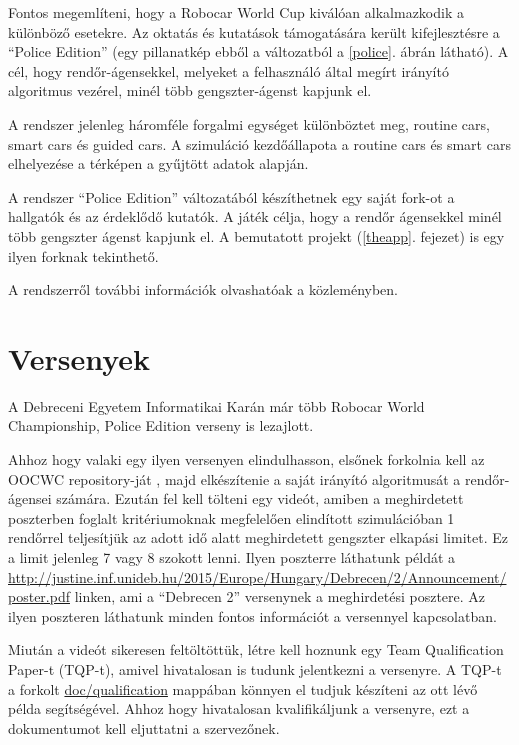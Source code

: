 \documentclass[a4paper,12pt]{report}
\begin{document}
\vspace{2mm}
Fontos megemlíteni, hogy a Robocar World Cup kiválóan alkalmazkodik a különböző esetekre. Az oktatás és kutatások támogatására került kifejlesztésre a ``Police Edition'' (egy pillanatkép ebből a változatból a \ref{police}. ábrán látható). A cél, hogy rendőr-ágensekkel, melyeket a felhasználó által megírt irányító algoritmus vezérel, minél több gengszter-ágenst kapjunk el.

\vspace{2mm}
A rendszer jelenleg háromféle forgalmi egységet különböztet meg, routine cars, smart cars és guided cars. A szimuláció kezdőállapota a routine cars és smart cars elhelyezése a térképen a gyűjtött adatok alapján.

\vspace{2mm}
A rendszer ``Police Edition'' változatából készíthetnek egy saját fork-ot a hallgatók és az érdeklődő kutatók. A játék célja, hogy a rendőr ágensekkel minél több gengszter ágenst kapjunk el. A bemutatott projekt (\ref{theapp}. fejezet) is egy ilyen forknak tekinthető.

\vspace{2mm}
A rendszerről további információk olvashatóak a \cite{infocomjournal} közleményben.

\section{Versenyek}
\label{championships}

A Debreceni Egyetem Informatikai Karán már több Robocar World Championship, Police Edition verseny is lezajlott. 

\vspace{2mm}
Ahhoz hogy valaki egy ilyen versenyen elindulhasson, elsőnek forkolnia kell az OOCWC repository-ját \cite{oocwcrepo}, majd elkészítenie a saját irányító algoritmusát a rendőr-ágensei számára. Ezután fel kell tölteni egy videót, amiben a meghirdetett poszterben foglalt kritériumoknak megfelelően elindított szimulációban 1 rendőrrel teljesítjük az adott idő alatt meghirdetett gengszter elkapási limitet. Ez a limit jelenleg 7 vagy 8 szokott lenni. Ilyen poszterre láthatunk példát a \url{http://justine.inf.unideb.hu/2015/Europe/Hungary/Debrecen/2/Announcement/poster.pdf} linken, ami a ``Debrecen 2'' versenynek a meghirdetési posztere. Az ilyen poszteren láthatunk minden fontos információt a versennyel kapcsolatban.

\vspace{2mm}
Miután a videót sikeresen feltöltöttük, létre kell hoznunk egy Team Qualification Paper-t (TQP-t), amivel hivatalosan is tudunk jelentkezni a versenyre. A TQP-t a forkolt \url{doc/qualification} mappában könnyen el tudjuk készíteni az ott lévő példa segítségével. Ahhoz hogy hivatalosan kvalifikáljunk a versenyre, ezt a dokumentumot kell eljuttatni a szervezőnek.
\end{document}
